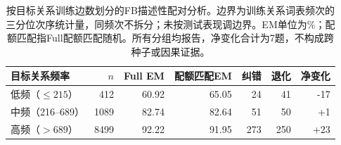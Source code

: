 \begin{table}[htbp]
\caption{按目标关系训练边数划分的FB描述性配对分析。边界为训练关系词表频次的三分位次序统计量，同频次不拆分；未按测试表现调边界。EM单位为\%；配额匹配指Full配额匹配随机。所有分组均报告，净变化合计为7题，不构成跨种子或因果证据。}
\label{tab:fb-frequency-slices}
\centering\small
\begin{tabular}{lrrrrrr}
\toprule
目标关系频率 & $n$ & Full EM & 配额匹配EM & 纠错 & 退化 & 净变化 \\
\midrule
低频（$\leq215$） & 412 & 60.92 & 65.05 & 24 & 41 & -17 \\
中频（216--689） & 1089 & 82.74 & 82.64 & 51 & 50 & +1 \\
高频（$>689$） & 8499 & 92.22 & 91.95 & 273 & 250 & +23 \\
\bottomrule
\end{tabular}
\end{table}
